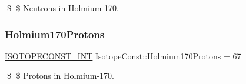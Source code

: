 \$ \$ Neutrons in Holmium-\/170. \mbox{\label{group___isotope_const-_holmium-_ho170_ga362ade632380fbb3a1310e7f9cc5484f}} 
\subsubsection{\texorpdfstring{Holmium170\+Protons}{Holmium170Protons}}
{\footnotesize\ttfamily \mbox{\hyperlink{group___isotope_const-_macros_ga5f18360b3e99483a35c32d789e62621c}{I\+S\+O\+T\+O\+P\+E\+C\+O\+N\+S\+T\+\_\+\+I\+NT}} Isotope\+Const\+::\+Holmium170\+Protons = 67}

\$ \$ Protons in Holmium-\/170. 